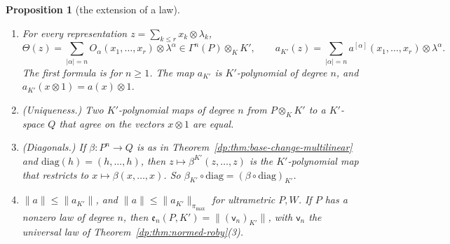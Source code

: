 \documentclass[11pt]{amsart}
\newtheorem{proposition}[theorem]{Proposition}
\theoremstyle{definition}
\theoremstyle{remark}
\numberwithin{equation}{section}
\newcommand{\abs}[1]{\lvert #1\rvert}
\newcommand{\norm}[1]{\lVert #1\rVert}
\theoremstyle{plain}
\theoremstyle{definition}
\theoremstyle{plain}
\begin{document}
\begin{proposition}[the extension of a law]\label{dp:prop:law-extension}
\leavevmode
\begin{enumerate}
\item For every representation $z=\sum_{k\le r}x_k\otimes\lambda_k$,
\begin{equation}\label{dp:bc:formula}
 \Theta(z)=\sum_{\abs\alpha=n}O_\alpha(x_1,\dots,x_r)\otimes\lambda^\alpha\in\Gamma^n(P)\otimes_KK',\qquad a_{K'}(z)=\sum_{\abs\alpha=n}a^{[\alpha]}(x_1,\dots,x_r)\otimes\lambda^\alpha.
\end{equation}
The first formula is for $n\ge1$. The map $a_{K'}$ is $K'$-polynomial of degree $n$, and $a_{K'}(x\otimes1)=a(x)\otimes1$.
\item \textup{(Uniqueness.)} Two $K'$-polynomial maps of degree $n$ from $P\otimes_KK'$ to a $K'$-space $Q$ that agree on the vectors $x\otimes1$ are equal.
\item \textup{(Diagonals.)} If $\beta\colon P^n\to Q$ is as in Theorem~\ref{dp:thm:base-change-multilinear} and $\mathrm{diag}(h)=(h,\dots,h)$, then $z\mapsto\beta^{K'}(z,\dots,z)$ is the $K'$-polynomial map that restricts to $x\mapsto\beta(x,\dots,x)$. So $\beta_{K'}\circ\mathrm{diag}=(\beta\circ\mathrm{diag})_{K'}$.
\item $\norm a\le\norm{a_{K'}}$, and $\norm a\le\norm{a_{K'}}_{\pi_{\max}}$ for ultrametric $P,W$. If $P$ has a nonzero law of degree $n$, then $\mathfrak e_n(P,K')=\norm{(\mathsf v_n)_{K'}}$, with $\mathsf v_n$ the universal law of Theorem~\ref{dp:thm:normed-roby}(3).
\end{enumerate}
\end{proposition}
\end{document}
